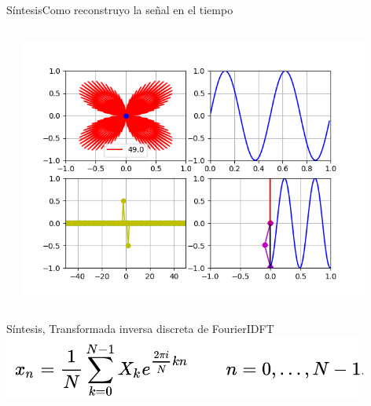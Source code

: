 \begin{frame}{Síntesis}{Como reconstruyo la señal en el tiempo}
   \handsonicon
   \begin{columns}[c]
      \hspace{2pt}
      \begin{column}{.4\textwidth}
         
      \end{column}
      \hspace{2pt}
      \vrule
      \hspace{2pt}
      \begin{column}{.6\textwidth}
         \centering\includegraphics[width=0.9\textwidth]{4_clase/euler6}
      \end{column}
      \hspace{2pt}
   \end{columns}
   \vfill
\end{frame}
 \begin{frame}{Síntesis, Transformada inversa discreta de Fourier}{IDFT}
    \center\includegraphics[width=0.9\textwidth]{4_clase/idft_eq}
    \vfill
 \end{frame}

